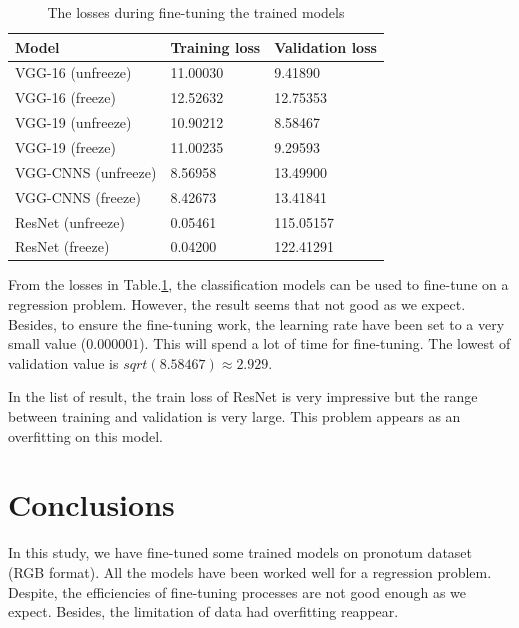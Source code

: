\documentclass[12pt,a4paper]{article}
\begin{document}
\begin{table}[h!]
	\centering
	\begin{tabular}{l l l}
	Model & Training loss & Validation loss \\ \hline
	VGG-16 (unfreeze) & 11.00030 & 9.41890  \\ \hline
	VGG-16 (freeze) & 12.52632 & 12.75353 \\ \hline
	VGG-19 (unfreeze) & 10.90212 & 8.58467 \\ \hline
	VGG-19 (freeze) & 11.00235 & 9.29593 \\ \hline
	VGG-CNNS (unfreeze) & 8.56958 & 13.49900 \\ \hline
	VGG-CNNS (freeze) & 8.42673 & 13.41841 \\ \hline
	ResNet (unfreeze) & 0.05461 & 115.05157 \\ \hline
	ResNet (freeze) & 0.04200 & 122.41291 \\ \hline
	\end{tabular}
	\caption{The losses during fine-tuning the trained models}
	\label{result}
\end{table}
From the losses in Table.\ref{result}, the classification models can be used to fine-tune on a regression problem. However, the result seems that not good as we expect. Besides, to ensure the fine-tuning work, the learning rate have been set to a very small value ($0.000001$). This will spend a lot of time for fine-tuning. The lowest of validation value is $sqrt(8.58467) \approx 2.929$.

In the list of result, the train loss of ResNet is very impressive but the range between training and validation is very large. This problem appears as an overfitting on this model.
\section{Conclusions}
In this study, we have fine-tuned some trained models on pronotum dataset (RGB format). All the models have been worked well for a regression problem. Despite, the efficiencies of fine-tuning processes are not good enough as we expect. Besides, the limitation of data had overfitting reappear.


\end{document}
